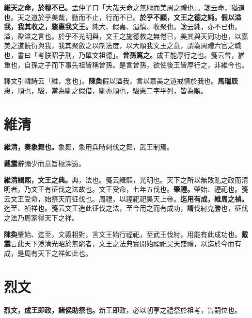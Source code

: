 \textbf{維天之命，於穆不已。}{\footnotesize 孟仲子曰「大哉天命之無極而美周之禮也」。箋云命，猶道也。天之道於乎美哉，動而不止，行而不已。}\textbf{於乎不顯，文王之德之純。假以溢我，我其收之，駿惠我文王。}{\footnotesize 純大、假嘉、溢慎、收聚也。箋云純，亦不已也。溢，盈溢之言也。於乎不光明與，文王之施德教之無倦已，美其與天同功也，以嘉美之道饒衍與我，我其聚斂之以制法度，以大順我文王之意，謂為周禮六官之職也，書曰「考朕昭子刑，乃單文祖德」。}\textbf{曾孫篤之。}{\footnotesize 成王能厚行之也。箋云曾，猶重也，自孫之子而下事先祖皆稱曾孫。是言曾孫，欲使後王皆厚行之，非維今也。}

\begin{quoting}釋文引韓詩云「維，念也」。\textbf{陳奐}假以溢我，言以嘉美之道戒慎於我也。\textbf{馬瑞辰}惠，順也，駿，當為馴之假借，馴亦順也，駿惠二字平列，皆為順。\end{quoting}

\section{維清}


\textbf{維清，奏象舞也。}{\footnotesize 象舞，象用兵時刺伐之舞，武王制焉。}

\begin{quoting}\textbf{戴震}辭彌少而意旨極深遠。\end{quoting}

\textbf{維清緝熙，文王之典。}{\footnotesize 典，法也。箋云緝熙，光明也。天下之所以無敗亂之政而清明者，乃文王有征伐之法故也。文王受命，七年五伐也。}\textbf{肇禋。}{\footnotesize 肇始、禋祀也。箋云文王受命，始祭天而征伐也。周禮，以禋祀祀昊天上帝。}\textbf{迄用有成，維周之禎。}{\footnotesize 迄至、禎祥也。箋云文王造此征伐之法，至今用之而有成功，謂伐紂克勝也，征伐之法乃周家得天下之祥。}

\begin{quoting}\textbf{陳奐}肇始、迄至，文義相對，言文王始行禋祀，至武王伐紂，用能有此成功也。\textbf{戴震}言此天下澄清光昭於無窮者，文王之法典實開始禋祀昊天盛禮，以迄於今而有成，是周有天下之祥如此也。\end{quoting}

\section{烈文}


\textbf{烈文，成王即政，諸侯助祭也。}{\footnotesize 新王即政，必以朝享之禮祭於祖考，告嗣位也。}

